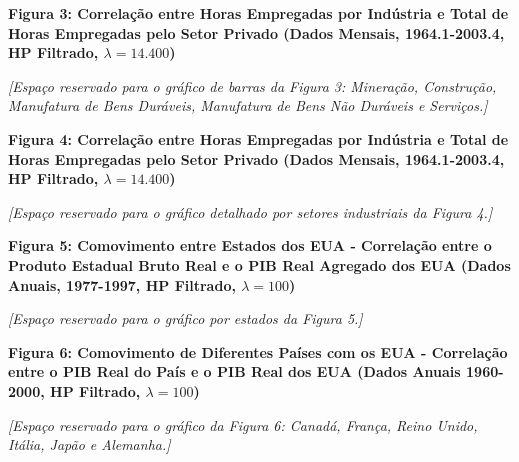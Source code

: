 \documentclass[12pt]{article}
\begin{document}
\begin{center}
\textbf{Figura 3: Correlação entre Horas Empregadas por Indústria e Total de Horas Empregadas pelo Setor Privado (Dados Mensais, 1964.1-2003.4, HP Filtrado, $\lambda = 14.400$)}
\end{center}

\textit{[Espaço reservado para o gráfico de barras da Figura 3: Mineração, Construção, Manufatura de Bens Duráveis, Manufatura de Bens Não Duráveis e Serviços.]}

\vspace{1cm}

\begin{center}
\textbf{Figura 4: Correlação entre Horas Empregadas por Indústria e Total de Horas Empregadas pelo Setor Privado (Dados Mensais, 1964.1-2003.4, HP Filtrado, $\lambda = 14.400$)}
\end{center}

\textit{[Espaço reservado para o gráfico detalhado por setores industriais da Figura 4.]}

\vspace{1cm}

\begin{center}
\textbf{Figura 5: Comovimento entre Estados dos EUA - Correlação entre o Produto Estadual Bruto Real e o PIB Real Agregado dos EUA (Dados Anuais, 1977-1997, HP Filtrado, $\lambda=100$)}
\end{center}

\textit{[Espaço reservado para o gráfico por estados da Figura 5.]}

\vspace{1cm}

\begin{center}
\textbf{Figura 6: Comovimento de Diferentes Países com os EUA - Correlação entre o PIB Real do País e o PIB Real dos EUA (Dados Anuais 1960-2000, HP Filtrado, $\lambda = 100$)}
\end{center}

\textit{[Espaço reservado para o gráfico da Figura 6: Canadá, França, Reino Unido, Itália, Japão e Alemanha.]}
\end{document}
